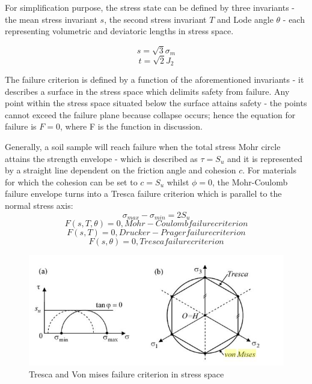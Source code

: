 \documentclass[10pt,a4paper]{report}
\begin{document}
For simplification purpose, the stress state can be defined by three invariants - the mean stress invariant $s$, the second stress invariant $T$ and Lode angle $\theta$ - each representing volumetric and deviatoric lengths in stress space.

\begin{equation}
	s=\sqrt{3}\sigma_m
\end{equation}
\begin{equation}
	t=\sqrt{2}J_2
\end{equation}

The failure criterion is defined by a function of the aforementioned invariants - it describes a surface in the stress space which delimits safety from failure. Any point within the stress space situated below the surface attains safety - the points cannot exceed the failure plane because collapse occurs; hence the equation for failure is $F = 0$, where F is the function in discussion. 

Generally, a soil sample will reach failure when the total stress Mohr circle attains the strength envelope - which is described as $\tau=S_u$ and it is represented by a straight line dependent on the friction angle and cohesion $c$. For materials for which the cohesion can be set to $c=S_u$ whilst $\phi=0$, the Mohr-Coulomb failure envelope turns into a Tresca failure criterion which is parallel to the normal stress axis:
\begin{equation}
	\sigma_{max}-\sigma_{min}=2S_u
\end{equation}
\begin{equation}
F(s,T,\theta)=0, Mohr-Coulomb failure criterion
\end{equation}
\begin{equation}
F(s,T)=0, Drucker-Prager failure criterion
\end{equation}
\begin{equation}
F(s,\theta)=0, Tresca failure criterion
\end{equation}

\begin{figure}[h!]
	\centering
	\includegraphics[width=0.8\linewidth]{"tresca"}
	\caption{Tresca and Von mises failure criterion in stress space}
	\label{tresca}
\end{figure}
\end{document}
